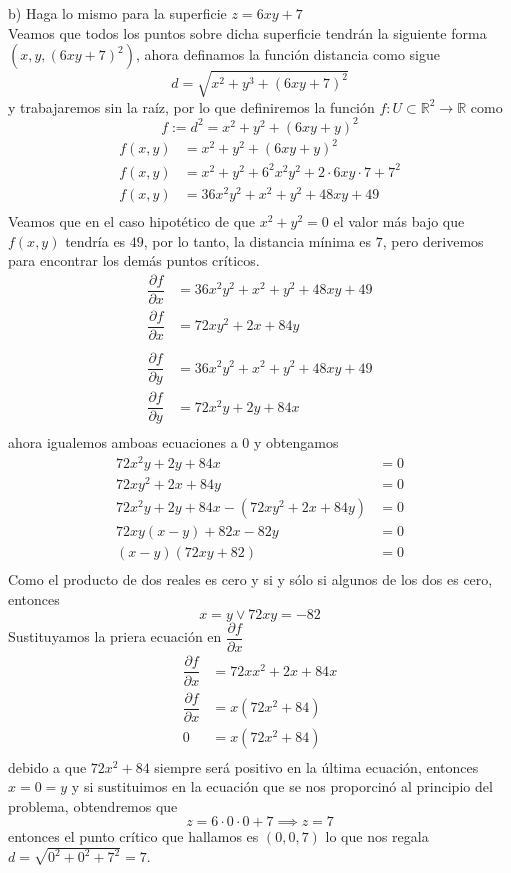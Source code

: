 \documentclass[letterpaper]{article}
\renewcommand{\d}{\partial}
\newcommand{\R}{\mathds{R}}
\renewcommand{\*}{\cdot}
\theoremstyle{definition}
\begin{document}
b) Haga lo mismo para la superficie $z = 6xy + 7$\\

Veamos que todos los puntos sobre dicha superficie tendrán la siguiente forma $ (x, y, (6xy + 7)^2)  $, ahora definamos la función distancia como sigue \[ d = \sqrt{x^2 + y^3 + (6xy +7)^2} \]y trabajaremos sin la raíz, por lo que definiremos la función $ f: U \subset \R^2 \to \R $ como $$ f := d^2 =x^2 + y^2 + (6xy + y)^2 $$
\begin{align*}
	f(x,y) &= x^2 + y^2 + (6xy + y)^2 \\
	f(x,y) &= x^2 + y^2 + 6^2x^2y^2 +2\*6xy\*7 +7^2 \\
	f(x,y) &= 36x^2y^2  + x^2 + y^2 + 48xy + 49 \\
\end{align*}
Veamos que en el caso hipotético de que $ x^2 + y^2 = 0 $ el valor más bajo que $ f(x,y) $ tendría es $ 49 $, por lo tanto, la distancia mínima es $ 7 $, pero derivemos para encontrar los demás puntos críticos.
\begin{align*}
	\dfrac{\d f}{\d x} &= 36x^2y^2  + x^2 + y^2 + 48xy + 49\\
	\dfrac{\d f}{\d x} &= 72xy^2+2x+84y\\
	\\
	\dfrac{\d f}{\d y} &= 36x^2y^2  + x^2 + y^2 + 48xy + 49\\
	\dfrac{\d f}{\d y} &= 72x^2 y + 2y + 84x\\
\end{align*}
ahora igualemos amboas ecuaciones a 0 y obtengamos
\begin{align*}
	72x^2 y + 2y + 84x &= 0\\
	 72xy^2+2x+84y &= 0 \\
	72x^2 y + 2y + 84x - (72xy^2+2x+84y) &= 0\\
	72xy ( x - y ) + 82x - 82y &= 0\\
	( x - y ) (72xy + 82) &= 0\\
\end{align*}
Como el producto de dos reales es cero y si y sólo si algunos de los dos es cero, entonces
\[ x = y \lor 72xy = -82 \]
Sustituyamos la priera ecuación en $ \dfrac{\d f}{\d x} $
\begin{align*}
	\dfrac{\d f}{\d x} &= 72xx^2 + 2x + 84x\\
	\dfrac{\d f}{\d x} &= x(72x^2 + 84)\\
	0 &= x(72x^2 + 84)\\
\end{align*}
debido a que $72x^2 + 84   $ siempre será positivo en la última ecuación, entonces $ x = 0 = y $ y si sustituimos en la ecuación que se nos proporcinó al principio del problema, obtendremos que 
\[ z = 6 \* 0 \* 0 + 7 \implies z = 7 \]entonces el punto crítico que hallamos es $ (0,0,7) $ lo que nos regala $ d = \sqrt{0^2 + 0^2+ 7^2 } = 7 $.\\
\end{document}
